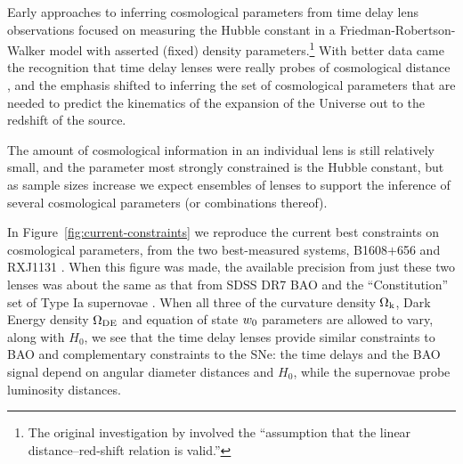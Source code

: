 


Early approaches to inferring cosmological parameters from time delay
lens observations focused on measuring the Hubble constant in a
Friedman-Robertson-Walker model with asserted (fixed) density
parameters.\footnote{The original investigation by \citet{Ref64}
involved the ``assumption that the linear distance--red-shift relation
is valid.''} With better data came the recognition that time delay
lenses were really probes of cosmological distance
\citep{Koo++03,Suy++10}, and the emphasis shifted to
inferring the set of cosmological parameters that are needed  to predict
the kinematics of the expansion of the Universe out to the redshift of
the source.

The amount of cosmological information in an individual lens
is still relatively small, and the parameter most strongly constrained
is  the Hubble constant, but as sample sizes increase we expect
ensembles of  lenses to support the inference of several cosmological
parameters (or combinations thereof).

In Figure~\ref{fig:current-constraints} we reproduce the current best
constraints on  cosmological parameters, from the two best-measured
systems, B1608$+$656 and RXJ1131 \citep{Suy++14}. When this figure was
made, the available precision from just these two lenses was about the
same as that from SDSS DR7 BAO \citep{PercivalEtal2010} and the
``Constitution'' set of Type Ia supernovae \citep{HickenEtal2009}.
When all three of the curvature density $\Omega_{\rm k}$, Dark Energy
density $\Omega_{\rm DE}$ and equation of state
$w_0$ parameters are allowed to vary, along with $H_0$, we see that the
time delay lenses provide similar constraints to BAO and complementary
constraints to the SNe: the time delays and
the BAO signal depend on angular diameter distances and $H_0$, while
the supernovae probe luminosity distances.

